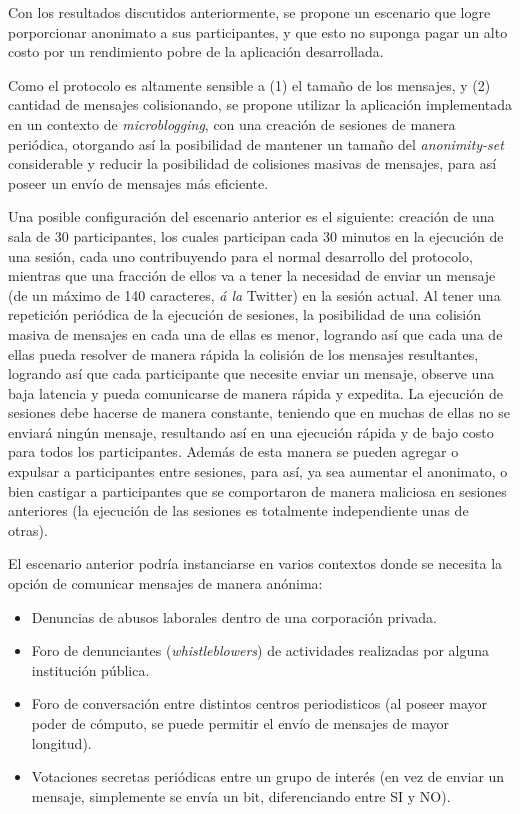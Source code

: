Con los resultados discutidos anteriormente, se propone un escenario que logre 
porporcionar anonimato a sus participantes, y que esto no suponga pagar un alto 
costo por un rendimiento pobre de la aplicación desarrollada.

Como el protocolo es altamente sensible a (1) el tamaño de los mensajes, y (2) cantidad 
de mensajes colisionando, se propone utilizar la aplicación implementada en un contexto 
de \emph{microblogging}, con una creación de sesiones de manera periódica, otorgando 
así la posibilidad de mantener un tamaño del \emph{anonimity-set} considerable y reducir 
la posibilidad de colisiones masivas de mensajes, para así poseer un envío de mensajes 
más eficiente.

Una posible configuración del escenario anterior es el siguiente: creación de una sala 
de 30 participantes, los cuales participan cada 30 minutos en la ejecución de una sesión, 
cada uno contribuyendo para el normal desarrollo del protocolo, mientras que una fracción 
de ellos va a tener la necesidad de enviar un mensaje (de un máximo de 140 caracteres, 
\emph{á la} Twitter) en la sesión actual. Al tener una repetición periódica de la ejecución 
de sesiones, la posibilidad de una colisión masiva de mensajes en cada una de ellas es menor, 
logrando así que cada una de ellas pueda resolver de manera rápida la colisión de los mensajes 
resultantes, logrando así que cada participante que necesite enviar un mensaje, observe una 
baja latencia y pueda comunicarse de manera rápida y expedita. La ejecución de sesiones 
debe hacerse de manera constante, teniendo que en muchas de ellas no se enviará ningún mensaje, 
resultando así en una ejecución rápida y de bajo costo para todos los participantes. Además de esta 
manera se pueden agregar o expulsar a participantes entre sesiones, para así, ya sea aumentar 
el anonimato, o bien castigar a participantes que se comportaron de manera maliciosa en sesiones 
anteriores (la ejecución de las sesiones es totalmente independiente unas de otras).

El escenario anterior podría instanciarse en varios contextos donde se necesita la opción 
de comunicar mensajes de manera anónima:
\begin{itemize}
	\item Denuncias de abusos laborales dentro de una corporación privada.
	\item Foro de denunciantes (\emph{whistleblowers}) de actividades 
	realizadas por alguna institución pública.
	\item Foro de conversación entre distintos centros periodisticos (al poseer mayor 
	poder de cómputo, se puede permitir el envío de mensajes de mayor longitud).
	\item Votaciones secretas periódicas entre un grupo de interés (en vez de enviar un mensaje, 
	simplemente se envía un bit, diferenciando entre SI y NO).
\end{itemize} 